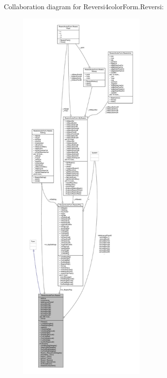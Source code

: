 Collaboration diagram for Reversi4color\+Form.\+Reversi\+:
\nopagebreak
\begin{figure}[H]
\begin{center}
\leavevmode
\includegraphics[height=550pt]{class_reversi4color_form_1_1_reversi__coll__graph}
\end{center}
\end{figure}
